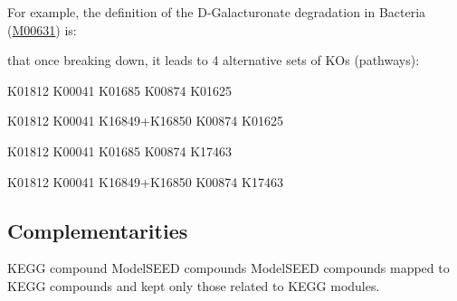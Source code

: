 \documentclass[sn-mathphys,Numbered, lineno]{sn-jnl}  %
\theoremstyle{thmstyleone}%
\theoremstyle{thmstyletwo}%
\theoremstyle{thmstylethree}%
\begin{document}
\begin{appendices}
            For example, the definition of the D-Galacturonate degradation in Bacteria (\href{https://www.genome.jp/dbget-bin/www_bget?M00631}{M00631}) is: \vspace{0.35cm}


            
            \begin{flushleft}
                that once breaking down, it leads to 4 alternative sets of KOs (pathways):\vspace{0.25cm}
            \end{flushleft} 

            K01812 K00041 K01685 K00874 K01625\vspace{0.25cm}

            K01812 K00041 K16849+K16850 K00874 K01625\vspace{0.25cm}

            K01812 K00041 K01685 K00874 K17463\vspace{0.25cm}

            K01812 K00041 K16849+K16850 K00874 K17463\vspace{0.5cm}


        \subsection{Complementarities}
            
            KEGG compound 
            ModelSEED compounds
            ModelSEED compounds mapped to KEGG compounds and kept only those related to KEGG modules. 


\end{appendices}



\end{document}
